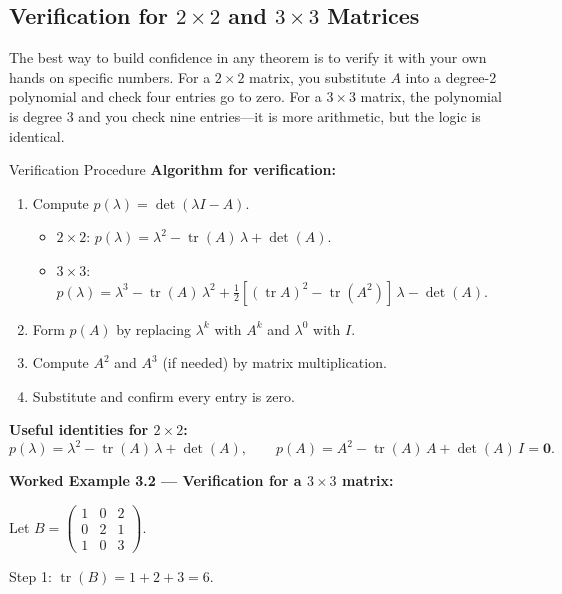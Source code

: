 \documentclass[12pt,a4paper]{article}
\begin{document}
\subsection{Verification for $2\times2$ and $3\times3$ Matrices}

The best way to build confidence in any theorem is to verify it with your own
hands on specific numbers.
For a $2\times 2$ matrix, you substitute $A$ into a degree-2 polynomial and check
four entries go to zero.
For a $3\times 3$ matrix, the polynomial is degree 3 and you check nine entries---it
is more arithmetic, but the logic is identical.

\begin{infobox}{Verification Procedure}
\textbf{Algorithm for verification:}
\begin{enumerate}
  \item Compute $p(\lambda) = \det(\lambda I - A)$.
        \begin{itemize}
          \item $2\times2$: $p(\lambda) = \lambda^{2} - \operatorname{tr}(A)\,\lambda + \det(A)$.
          \item $3\times3$: $p(\lambda) = \lambda^{3} - \operatorname{tr}(A)\,\lambda^{2}
                 + \tfrac{1}{2}[(\operatorname{tr}A)^{2}-\operatorname{tr}(A^{2})]\,\lambda - \det(A)$.
        \end{itemize}
  \item Form $p(A)$ by replacing $\lambda^{k}$ with $A^{k}$ and $\lambda^{0}$ with $I$.
  \item Compute $A^{2}$ and $A^{3}$ (if needed) by matrix multiplication.
  \item Substitute and confirm every entry is zero.
\end{enumerate}

\textbf{Useful identities for $2\times2$:}
\[
  p(\lambda) = \lambda^{2} - \operatorname{tr}(A)\,\lambda + \det(A), \qquad
  p(A) = A^{2} - \operatorname{tr}(A)\,A + \det(A)\,I = \mathbf{0}.
\]
\end{infobox}

\textbf{Worked Example 3.2 --- Verification for a $3\times3$ matrix:}

Let $B = \begin{pmatrix} 1 & 0 & 2 \\ 0 & 2 & 1 \\ 1 & 0 & 3 \end{pmatrix}$.

Step 1: $\operatorname{tr}(B) = 1+2+3 = 6$.
\end{document}
